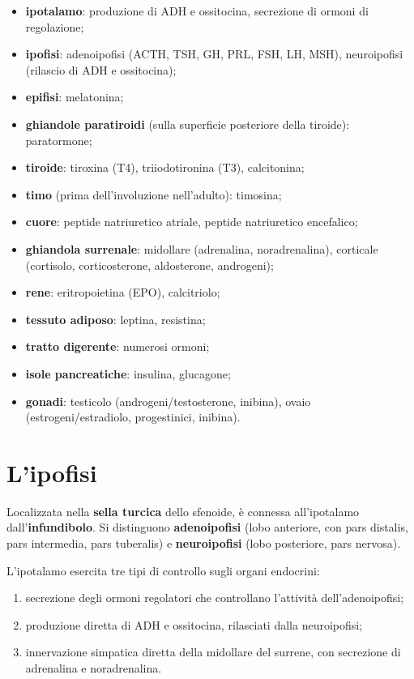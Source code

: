 \begin{itemize}
  \item \textbf{ipotalamo}: produzione di ADH e ossitocina, secrezione di
    ormoni di regolazione;
  \item \textbf{ipofisi}: adenoipofisi (ACTH, TSH, GH, PRL, FSH, LH, MSH),
    neuroipofisi (rilascio di ADH e ossitocina);
  \item \textbf{epifisi}: melatonina;
  \item \textbf{ghiandole paratiroidi} (sulla superficie posteriore della
    tiroide): paratormone;
  \item \textbf{tiroide}: tiroxina (T4), triiodotironina (T3), calcitonina;
  \item \textbf{timo} (prima dell'involuzione nell'adulto): timosina;
  \item \textbf{cuore}: peptide natriuretico atriale, peptide natriuretico
    encefalico;
  \item \textbf{ghiandola surrenale}: midollare (adrenalina, noradrenalina),
    corticale (cortisolo, corticosterone, aldosterone, androgeni);
  \item \textbf{rene}: eritropoietina (EPO), calcitriolo;
  \item \textbf{tessuto adiposo}: leptina, resistina;
  \item \textbf{tratto digerente}: numerosi ormoni;
  \item \textbf{isole pancreatiche}: insulina, glucagone;
  \item \textbf{gonadi}: testicolo (androgeni/testosterone, inibina), ovaio
    (estrogeni/estradiolo, progestinici, inibina).
\end{itemize}

\section{L'ipofisi}

Localizzata nella \textbf{sella turcica} dello sfenoide, è connessa
all'ipotalamo dall'\textbf{infundibolo}. Si distinguono
\textbf{adenoipofisi} (lobo anteriore, con pars distalis, pars intermedia,
pars tuberalis) e \textbf{neuroipofisi} (lobo posteriore, pars nervosa).

L'ipotalamo esercita tre tipi di controllo sugli organi endocrini:
\begin{enumerate}
  \item secrezione degli ormoni regolatori che controllano l'attività
    dell'adenoipofisi;
  \item produzione diretta di ADH e ossitocina, rilasciati dalla
    neuroipofisi;
  \item innervazione simpatica diretta della midollare del surrene, con
    secrezione di adrenalina e noradrenalina.
\end{enumerate}

